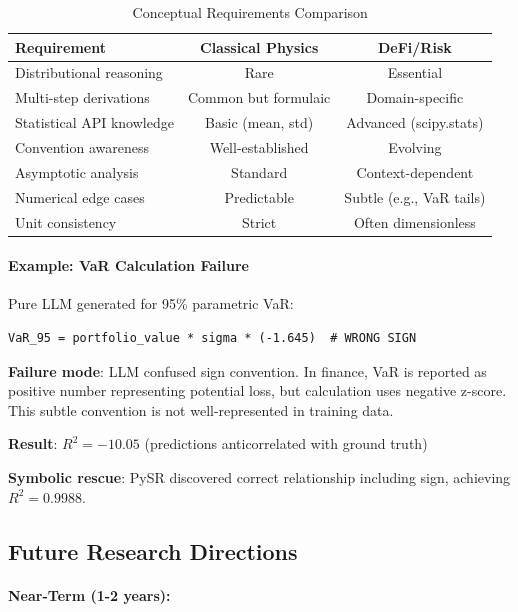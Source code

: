 \documentclass[twoside,11pt]{article}
\begin{document}
\begin{table}[H]
\centering
\caption{Conceptual Requirements Comparison}
\label{tab:conceptual_complexity}
\begin{tabular}{@{}lcc@{}}
\toprule
\textbf{Requirement} & \textbf{Classical Physics} & \textbf{DeFi/Risk} \\
\midrule
Distributional reasoning & Rare & Essential \\
Multi-step derivations & Common but formulaic & Domain-specific \\
Statistical API knowledge & Basic (mean, std) & Advanced (scipy.stats) \\
Convention awareness & Well-established & Evolving \\
Asymptotic analysis & Standard & Context-dependent \\
Numerical edge cases & Predictable & Subtle (e.g., VaR tails) \\
Unit consistency & Strict & Often dimensionless \\
\bottomrule
\end{tabular}
\end{table}

\paragraph{Example: VaR Calculation Failure}

Pure LLM generated for 95\% parametric VaR:
\begin{verbatim}
VaR_95 = portfolio_value * sigma * (-1.645)  # WRONG SIGN
\end{verbatim}

\textbf{Failure mode}: LLM confused sign convention. In finance, VaR is reported as positive number representing potential loss, but calculation uses negative z-score. This subtle convention is not well-represented in training data\citep{lewkowycz2022minerva}.

\textbf{Result}: $R^2 = -10.05$ (predictions anticorrelated with ground truth)

\textbf{Symbolic rescue}: PySR discovered correct relationship including sign, achieving $R^2 = 0.9988$.

\subsection{Future Research Directions}
\label{sec:future_work}

\paragraph{Near-Term (1-2 years):}
\end{document}
